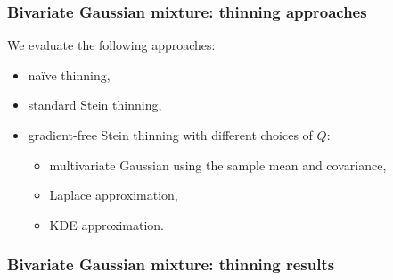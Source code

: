 \documentclass{beamer}
\begin{document}
\begin{frame}
\frametitle{Bivariate Gaussian mixture: thinning approaches}

We evaluate the following approaches:
\begin{itemize}
\item na\"ive thinning,
\item standard Stein thinning,
\item gradient-free Stein thinning with different choices of $Q$:
	\begin{itemize}
	\item multivariate Gaussian using the sample mean and covariance,
	\item Laplace approximation,
	\item KDE approximation.
	\end{itemize}
\end{itemize}

\end{frame}

\begin{frame}
\frametitle{Bivariate Gaussian mixture: thinning results}

\begin{figure}[H]
\centering
{}
\end{figure}

\end{frame}
\end{document}
